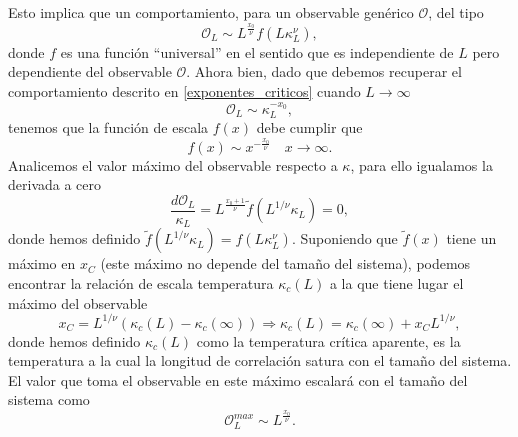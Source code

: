 Esto implica que un comportamiento, para un observable genérico $\mathcal{O}$, del tipo
\begin{equation*}
\mathcal{O}_L\sim L^{\frac{x_0}{\nu}}f(L \kappa_L^{\nu}),
\end{equation*}
donde $f$ es una función ``universal'' en el sentido que es independiente de
$L$ pero dependiente del observable $\mathcal{O}$. Ahora bien, dado que
debemos recuperar el comportamiento descrito en \ref{exponentes_criticos}
cuando $L\rightarrow \infty$ 
\begin{equation*}
\mathcal{O}_L\sim \kappa_L^{-x_0},
\end{equation*}
tenemos que la función de escala $f(x)$ debe cumplir que
\begin{equation*}
f(x)\sim x^{-\frac{x_0}{\nu}}\quad x\rightarrow \infty.
\end{equation*}
Analicemos el valor máximo del observable respecto a $\kappa$, para ello
igualamos la derivada a cero
\begin{equation*}
\frac{d\mathcal{O}_L}{\kappa_L}=L^{\frac{x_0+1}{\nu}}\tilde{f}(L^{1/\nu} \kappa_L)=0,
\end{equation*}
donde hemos definido $\tilde{f}(L^{1/\nu}\kappa_L)=f(L\kappa_L^{\nu})$. Suponiendo que
$\tilde{f}(x)$ tiene un máximo en $x_C$ (este máximo no depende del tamaño del
sistema), podemos encontrar la relación de escala
temperatura $\kappa_c(L)$ a la que tiene lugar el máximo del observable
\begin{equation*}
x_C=L^{1/\nu}(\kappa_c(L)-\kappa_c(\infty))\Rightarrow \kappa_c(L)=\kappa_c(\infty)+x_CL^{1/\nu},
\end{equation*}
donde hemos definido $\kappa_c(L)$ como la temperatura crítica aparente, es la temperatura a la cual
la longitud de correlación satura con el tamaño del sistema. El valor que toma
el observable en este máximo escalará con el tamaño del sistema como
\begin{equation*}
\mathcal{O}^{max}_L\sim L^{\frac{x_0}{\nu}}.
\end{equation*}

